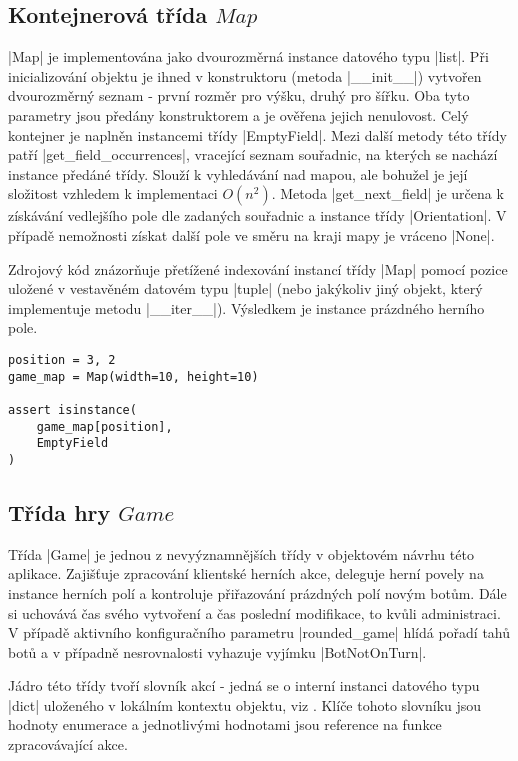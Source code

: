 \subsection{Kontejnerová třída $Map$}

\ic|Map| je implementována jako dvourozměrná instance datového typu \ic|list|. Při inicializování objektu je ihned v konstruktoru (metoda \ic|__init__|) vytvořen dvourozměrný seznam - první rozměr pro výšku, druhý pro šířku. Oba tyto parametry jsou předány konstruktorem a je ověřena jejich nenulovost. Celý kontejner je naplněn instancemi třídy \ic|EmptyField|. Mezi další metody této třídy patří \ic|get_field_occurrences|, vracející seznam souřadnic, na kterých se nachází instance předáné třídy. Slouží k vyhledávání nad mapou, ale bohužel je její složitost vzhledem k implementaci $O(n^2)$. Metoda \ic|get_next_field| je určena k získávání vedlejšího pole dle zadaných souřadnic a instance třídy \ic|Orientation|. V případě nemožnosti získat další pole ve směru na kraji mapy je vráceno \ic|None|. 

Zdrojový kód  znázorňuje přetížené indexování instancí třídy \ic|Map| pomocí pozice uložené v vestavěném datovém typu \ic|tuple| (nebo jakýkoliv jiný objekt, který implementuje metodu \ic|__iter__|). Výsledkem je instance prázdného herního pole.

\begin{lstlisting}[caption={Přetížené indexování třídy $Map$},label={lst:map-indexing}]
position = 3, 2
game_map = Map(width=10, height=10)

assert isinstance(
	game_map[position],
	EmptyField
)
\end{lstlisting}

\subsection{Třída hry $Game$}

Třída \ic|Game| je jednou z nevyýznamnějších třídy v objektovém návrhu této aplikace. Zajišťuje zpracování klientské herních akce, deleguje herní povely na instance herních polí a kontroluje přiřazování prázdných polí novým botům. Dále si uchovává čas svého vytvoření a čas poslední modifikace, to kvůli administraci. V případě aktivního konfiguračního parametru \ic|rounded_game| hlídá pořadí tahů botů a v případně nesrovnalosti vyhazuje vyjímku \ic|BotNotOnTurn|.

Jádro této třídy tvoří slovník akcí - jedná se o interní instanci datového typu \ic|dict| uloženého v lokálním kontextu objektu, viz . Klíče tohoto slovníku jsou hodnoty enumerace  a jednotlivými hodnotami jsou reference na funkce zpracovávající akce.

